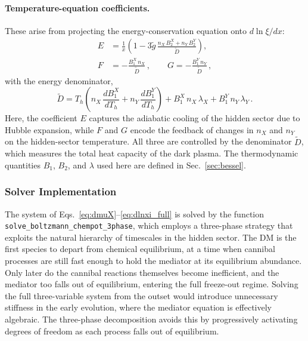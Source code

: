 \documentclass[11pt]{article}
\numberwithin{equation}{section}
\begin{document}
\paragraph{Temperature-equation coefficients.}
These arise from projecting the energy-conservation equation onto
$d\ln\xi/dx$:
%
\begin{align}
  E &= \frac{1}{x}
       \left(1 - 3\tilde g\,
             \frac{n_X\,B_2^X + n_Y\,B_2^Y}{\tilde D}
       \right),
  \label{eq:Ecoeff}
  \\
  F &= -\frac{B_1^X\,n_X}{\tilde D}\,,
  \qquad
  G = -\frac{B_1^Y\,n_Y}{\tilde D}\,,
  \label{eq:Gcoeff}
\end{align}
%
with the energy denominator,
\begin{equation}
  \tilde D
  = T_h\!\left(
      n_X\,\frac{dB_1^X}{dT_h}
    + n_Y\,\frac{dB_1^Y}{dT_h}
    \right)
  + B_1^X\,n_X\,\lambda_X
  + B_1^Y\,n_Y\,\lambda_Y\,.
  \label{eq:Dtilde}
\end{equation}
%
Here, the coefficient $E$ captures the adiabatic cooling of the hidden sector due to Hubble expansion, while $F$ and $G$ encode the feedback of changes in $n_X$ and $n_Y$ on the hidden-sector temperature. All three are controlled by the denominator $\tilde D$, which measures the total heat capacity of the dark plasma. The thermodynamic quantities $B_1$, $B_2$, and $\lambda$ used here are defined
in Sec.~\ref{sec:bessel}.

\subsubsection{Solver Implementation}
\label{sec:solver}

The system of Eqs.~\eqref{eq:dmuX}--\eqref{eq:dlnxi_full} is solved by the function \texttt{solve\_boltzmann\_chempot\_3phase}, which employs a three-phase strategy that exploits the natural hierarchy of timescales in the hidden sector. The DM is the first species to depart from chemical equilibrium, at a time when cannibal processes are still fast enough to hold the mediator at its equilibrium abundance. Only later do the cannibal reactions themselves become inefficient, and the mediator too falls out of equilibrium, entering the full freeze-out regime. Solving the full three-variable system from the outset would introduce unnecessary stiffness in the early evolution, where the mediator equation is effectively algebraic. The three-phase decomposition avoids this by progressively activating degrees of freedom as each process falls out of equilibrium.
\end{document}
